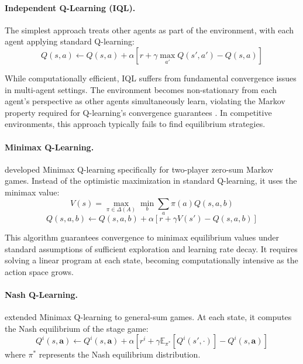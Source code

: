 \paragraph{Independent Q-Learning (IQL).} The simplest approach treats other agents as part of the environment, with each agent applying standard Q-learning:
\begin{equation}
Q(s,a) \leftarrow Q(s,a) + \alpha [r + \gamma \max_{a'} Q(s',a') - Q(s,a)]
\end{equation}

While computationally efficient, IQL suffers from fundamental convergence issues in multi-agent settings. The environment becomes non-stationary from each agent's perspective as other agents simultaneously learn, violating the Markov property required for Q-learning's convergence guarantees \citep{Tan1993}. In competitive environments, this approach typically fails to find equilibrium strategies.

\paragraph{Minimax Q-Learning.} \citet{littman1994_minimaxq} developed Minimax Q-learning specifically for two-player zero-sum Markov games. Instead of the optimistic maximization in standard Q-learning, it uses the minimax value:
\begin{equation}
V(s) = \max_{\pi \in \Delta(A)} \min_{b} \sum_{a} \pi(a) Q(s, a, b)
\end{equation}
\begin{equation}
Q(s, a, b) \leftarrow Q(s, a, b) + \alpha[r + \gamma V(s') - Q(s, a, b)]
\end{equation}

This algorithm guarantees convergence to minimax equilibrium values under standard assumptions of sufficient exploration and learning rate decay. It requires solving a linear program at each state, becoming computationally intensive as the action space grows.

\paragraph{Nash Q-Learning.} \citet{hu2003_nashq} extended Minimax Q-learning to general-sum games. At each state, it computes the Nash equilibrium of the stage game:
\begin{equation}
Q^i(s, \mathbf{a}) \leftarrow Q^i(s, \mathbf{a}) + \alpha[r^i + \gamma \mathbb{E}_{\pi^*}[Q^i(s', \cdot)] - Q^i(s, \mathbf{a})]
\end{equation}
where $\pi^*$ represents the Nash equilibrium distribution. 


